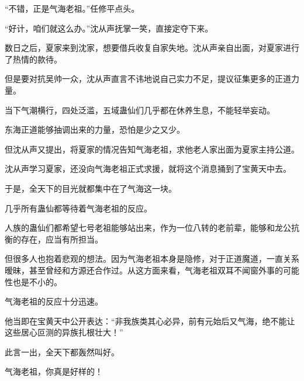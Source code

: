 \begin{this_body}
“不错，正是气海老祖。”任修平点头。

“好计，咱们就这么办。”沈从声抚掌一笑，直接定夺下来。

数日之后，夏家来到沈家，想要借兵收复自家失地。沈从声亲自出面，对夏家进行了热情的款待。

但是要对抗吴帅一众，沈从声直言不讳地说自己实力不足，提议征集更多的正道力量。

当下气潮横行，四处泛滥，五域蛊仙们几乎都在休养生息，不能轻举妄动。

东海正道能够抽调出来的力量，恐怕是少之又少。

但沈从声又提出，将夏家的情况告知气海老祖，求他老人家出面为夏家主持公道。

沈从声学习夏家，还没向气海老祖正式求援，就将这个消息捅到了宝黄天中去。

于是，全天下的目光就都集中在了气海这一块。

几乎所有蛊仙都等待着气海老祖的反应。

人族的蛊仙们都希望七号老祖能够站出来，作为一位八转的老前辈，能够和龙公抗衡的存在，应当有所担当。

但很多人也抱着悲观的想法。因为气海老祖本身是隐修，对于正道魔道，一直关系暧昧，甚至曾经和方源还合作过。从这方面来看，气海老祖双耳不闻窗外事的可能性也是不小的。

气海老祖的反应十分迅速。

他当即在宝黄天中公开表达：“非我族类其心必异，前有元始后又气海，绝不能让这些居心叵测的异族扎根壮大！”

此言一出，全天下都轰然叫好。

气海老祖，你真是好样的！

\end{this_body}

